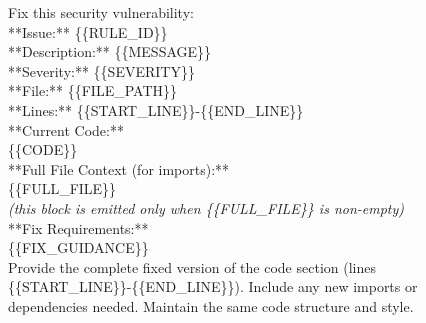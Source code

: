 \begin{tcolorbox}[
    colback=gray!5!white,
    colframe=gray!75!black,
    title=User message template A --- single finding (instantiated per finding),
    fonttitle=\bfseries,
    breakable
]
\small\ttfamily
Fix this security vulnerability:\\[6pt]
**Issue:** \{\{RULE\_ID\}\}\\
**Description:** \{\{MESSAGE\}\}\\
**Severity:** \{\{SEVERITY\}\}\\
**File:** \{\{FILE\_PATH\}\}\\
**Lines:** \{\{START\_LINE\}\}-\{\{END\_LINE\}\}\\[6pt]
**Current Code:**\\
\{\{CODE\}\}\\[6pt]
**Full File Context (for imports):**\\
\{\{FULL\_FILE\}\}\\
\hspace*{1em}\textrm{\itshape(this block is emitted only when
\{\{FULL\_FILE\}\} is non-empty)}\\[6pt]
**Fix Requirements:**\\
\{\{FIX\_GUIDANCE\}\}\\[6pt]
Provide the complete fixed version of the code section (lines\\
\{\{START\_LINE\}\}-\{\{END\_LINE\}\}). Include any new imports or\\
dependencies needed. Maintain the same code structure and style.
\end{tcolorbox}

